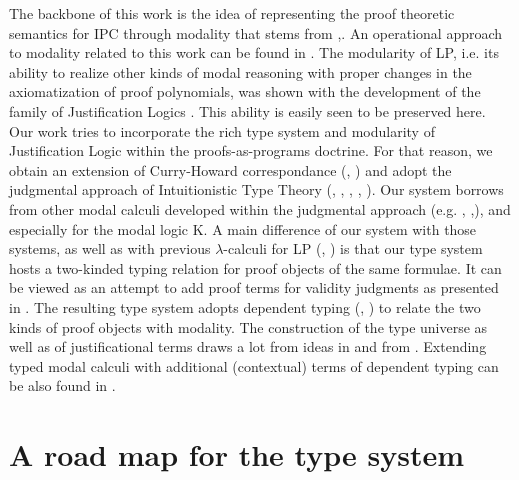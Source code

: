 \documentclass[11pt]{eptcs} %
\begin{document}

The backbone of this work is the idea of representing the proof theoretic semantics for {\sf IPC} through modality that stems from \cite{Art01BSL},\cite{Art02CSLI}.  An operational approach to  modality related to this work can be found in \cite{Art95TR}. The modularity of {\sf LP}, i.e. its ability to realize other kinds of modal reasoning with proper changes in the axiomatization of proof polynomials, was shown with the development of the family of Justification Logics \cite{DBLP:conf/jelia/Artemov08}. This ability is easily seen to be preserved here. Our work tries to incorporate the rich type system and modularity of Justification Logic within the proofs-as-programs doctrine. For that reason, we obtain an  extension of Curry-Howard correspondance (\cite{Sorensen98lectureson}, \cite{citeulike:993095}) and adopt the judgmental approach of Intuitionistic Type Theory (\cite{inp:martin-loef79a}, \cite{martin-lof84:inttt}, \cite{citeulike:5251552}, \cite{citeulike:2310446}, \cite{ awodey:kripke}). Our system borrows from other modal calculi developed  within the judgmental approach  (e.g. \cite{citeulike:5447115}, \cite{Goubault-Larrecq96oncomputational},\cite{Benaissa99logicalmodalities}), and especially \cite{Bellin01extendedcurry-howard} for the modal logic {\sf K}. A main difference of our system with those systems, as well as with previous $\lambda$-calculi for {\sf LP} (\cite{AA00}, \cite{ArtBon07LFCS}) is that our type system  hosts a two-kinded typing relation for proof objects of the same formulae. It can be viewed as an attempt to add proof terms for validity judgments as presented in \cite{citeulike:5447115}.  The resulting type system adopts dependent typing (\cite{citeulike:4846}, \cite{Norell08dependentlytyped}) to relate the two kinds of proof objects with modality.  The construction of the type universe as well as of justificational terms draws a lot from ideas in \cite{Artemov:2012:OJL:2317882.2317912}  and from \cite{FittingManuscript-FITTLO}. Extending typed modal calculi with additional (contextual) terms of dependent typing can be also found in \cite{Nanevski:2008:CMT:1352582.1352591}. 


\section{A road map for the type system}
\end{document}
